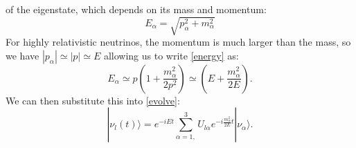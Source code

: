 of the eigenstate, which depends on its mass and momentum:
\begin{equation}\label{energy}
E_\alpha = \sqrt{p_\alpha^2 + m_\alpha^2}
\end{equation}
For highly relativistic neutrinos, the momentum is much larger than the mass,
so we have
$|p_\alpha| \simeq |p| \simeq E$ allowing us to write \eqref{energy} as:
\begin{equation}\label{energyApprox}
E_\alpha \simeq p(1+\frac{m_\alpha^2}{2p^2})\simeq (E+\frac{m_\alpha^2}{2E}).
\end{equation}
We can then substitute this into \eqref{evolve}:
\begin{equation}\label{evolveSub}
|\nu_l(t) \rangle = e^{-iEt} \sum_{\alpha = 1,}^3 U_{l\alpha}e^{-i\frac{m_\alpha^2}{2E} t}|\nu_\alpha\rangle.
\end{equation}

